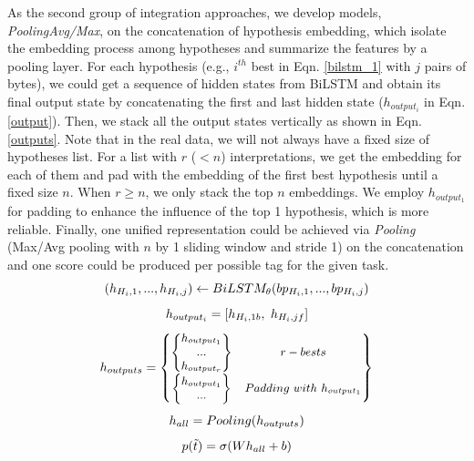 As the second group of integration approaches, we develop models, \textit{PoolingAvg/Max}, on the concatenation of hypothesis embedding, which isolate the embedding process among hypotheses and summarize the features by a pooling layer. For each hypothesis (e.g., $i^{th}$ best in Eqn. \ref{bilstm_1} with $j$ pairs of bytes), we could get a sequence of hidden states from BiLSTM and obtain its final output state by concatenating the first and last hidden state ($h_{output_i}$ in Eqn. \ref{output}).
Then, we stack  all the output states vertically as shown in Eqn. \ref{outputs}. Note that in the real data, we will not always have a fixed size of hypotheses list. For a list with $r$ ($<n$) interpretations, we get the embedding for each of them and pad with the embedding of the first best hypothesis until a fixed size $n$. When $r\geq n$, we only stack the top $n$ embeddings. We employ $h_{output_1}$ for padding to enhance the influence of the top 1 hypothesis, which is more reliable. Finally, one unified representation could be achieved via    \textit{Pooling} (Max/Avg pooling with $n$ by 1 sliding window and stride 1)  on the concatenation and one score could be produced per possible tag for the given task. 
\begin{equation}
\small{
	(h_{H_i, 1}, ... , h_{H_i, j})\leftarrow BiLSTM_{\theta}(bp_{H_i, 1},...,bp_{H_i, j})
}
\label{bilstm_1}
\end{equation}
\begin{equation}
\small{
	h_{output_i} = [h_{H_i, 1b},\ h_{H_i, jf}]
	\label{output}
}
\end{equation}
\begin{equation}
\small{
	h_{outputs} = \begin{Bmatrix}
	
	\begin{Bmatrix}
	h_{output_1}\\...\\ h_{output_r}
	\end{Bmatrix} & r-bests
	\\
	\begin{Bmatrix}
	h_{output_1}\\ ...
	\end{Bmatrix} & Padding\ with\ h_{output_1}
	\end{Bmatrix}
}
\label{outputs}
\end{equation}
\begin{equation}
\small{
	h_{all} = Pooling(h_{outputs})
}
\label{pooling}
\end{equation}
\begin{equation}
\small{
	p(\Tilde{t}) = \sigma(Wh_{all} +b)
}
\label{mlp_1}
\end{equation}

